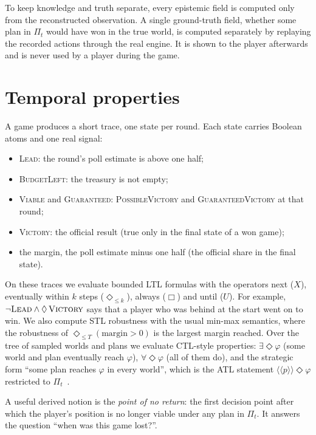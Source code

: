 \documentclass[11pt,a4paper,oneside]{report}
\begin{document}
To keep knowledge and truth separate, every epistemic field is computed only from the reconstructed
observation. A single ground-truth field, whether some plan in $\Pi_t$ would have won in the true world,
is computed separately by replaying the recorded actions through the real engine. It is shown to the
player afterwards and is never used by a player during the game.

\section{Temporal properties}

A game produces a short trace, one state per round. Each state carries Boolean atoms and one real signal:
\begin{itemize}
  \item \textsc{Lead}: the round's poll estimate is above one half;
  \item \textsc{BudgetLeft}: the treasury is not empty;
  \item \textsc{Viable} and \textsc{Guaranteed}: \textsc{PossibleVictory} and \textsc{GuaranteedVictory} at
        that round;
  \item \textsc{Victory}: the official result (true only in the final state of a won game);
  \item the margin, the poll estimate minus one half (the official share in the final state).
\end{itemize}
On these traces we evaluate bounded LTL formulas with the operators next ($X$), eventually within $k$
steps ($\Diamond_{\le k}$), always ($\Box$) and until ($U$). For example, $\lnot\textsc{Lead} \wedge
\Diamond\,\textsc{Victory}$ says that a player who was behind at the start went on to win. We also compute
STL robustness with the usual min-max semantics, where the robustness of
$\Diamond_{\le T}(\text{margin} > 0)$ is the largest margin reached. Over the tree of sampled worlds and
plans we evaluate CTL-style properties: $\exists\Diamond\varphi$ (some world and plan eventually reach
$\varphi$), $\forall\Diamond\varphi$ (all of them do), and the strategic form ``some plan reaches $\varphi$
in every world'', which is the ATL statement $\langle\!\langle p \rangle\!\rangle \Diamond\varphi$ restricted
to $\Pi_t$~\cite{alur2002}.

A useful derived notion is the \emph{point of no return}: the first decision point after which the player's
position is no longer viable under any plan in $\Pi_t$. It answers the question ``when was this game
lost?''.
\end{document}
